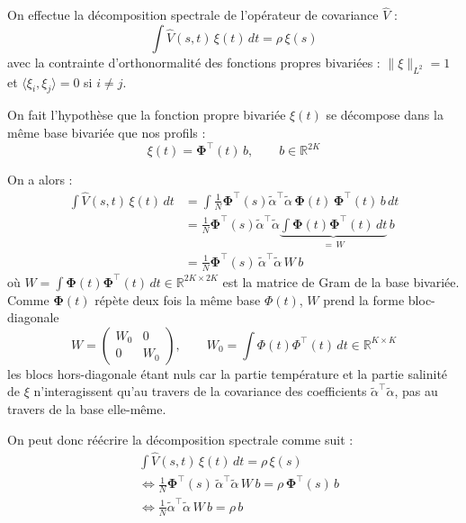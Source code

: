 \documentclass{article}
\begin{document}
	On effectue la décomposition spectrale de l'opérateur de covariance $\hat{V}$ :
	\[
	\int \hat{V}(s, t)\,\xi(t)\, dt = \rho\, \xi(s)
	\]
	avec la contrainte d'orthonormalité des fonctions propres bivariées : $\|\xi\|_{L^2} = 1$ et $\langle \xi_i, \xi_j\rangle = 0$ si $i \neq j$.
	
	On fait l'hypothèse que la fonction propre bivariée $\xi(t)$ se décompose dans la même base bivariée que nos profils :
	\[
	\xi(t) = \boldsymbol{\Phi}^\top(t)\, b, \qquad b \in \mathbb{R}^{2K}
	\]
	
	On a alors :
	\begin{align*}
		\int \hat{V}(s, t)\,\xi(t)\,dt 
		&= \int \frac{1}{N} \boldsymbol{\Phi}^\top(s)\tilde{\alpha}^\top \tilde{\alpha}\, \boldsymbol{\Phi}(t)\, \boldsymbol{\Phi}^\top(t)\, b\,dt \\
		&= \frac{1}{N} \boldsymbol{\Phi}^\top(s)\tilde{\alpha}^\top \tilde{\alpha} 
		\underbrace{\int \boldsymbol{\Phi}(t)\boldsymbol{\Phi}^\top(t)\,dt}_{=\, W} \, b \\
		&= \frac{1}{N}\boldsymbol{\Phi}^\top(s)\,\tilde{\alpha}^\top \tilde{\alpha}\, W\, b
	\end{align*}
	où $W = \int \boldsymbol{\Phi}(t)\boldsymbol{\Phi}^\top(t)\,dt \in \mathbb{R}^{2K \times 2K}$ est la matrice de Gram de la base bivariée. Comme $\boldsymbol{\Phi}(t)$ répète deux fois la même base $\Phi(t)$, $W$ prend la forme bloc-diagonale
	\[
	W = \begin{pmatrix} W_0 & 0 \\ 0 & W_0 \end{pmatrix}, 
	\qquad W_0 = \int \Phi(t)\Phi^\top(t)\,dt \in \mathbb{R}^{K \times K}
	\]
	les blocs hors-diagonale étant nuls car la partie température et la partie salinité de $\xi$ n'interagissent qu'au travers de la covariance des coefficients $\tilde\alpha^\top\tilde\alpha$, pas au travers de la base elle-même.
	
	On peut donc réécrire la décomposition spectrale comme suit :
	\begin{align*}
		& \int \hat{V}(s, t)\,\xi(t)\,dt = \rho\, \xi(s)\\
		& \iff \frac{1}{N}\boldsymbol{\Phi}^\top(s)\,\tilde{\alpha}^\top \tilde{\alpha}\, W\, b = \rho\, \boldsymbol{\Phi}^\top(s)\, b\\
		& \iff \frac{1}{N} \tilde{\alpha}^\top \tilde{\alpha}\, W\, b = \rho\, b
	\end{align*}
	
\end{document}
